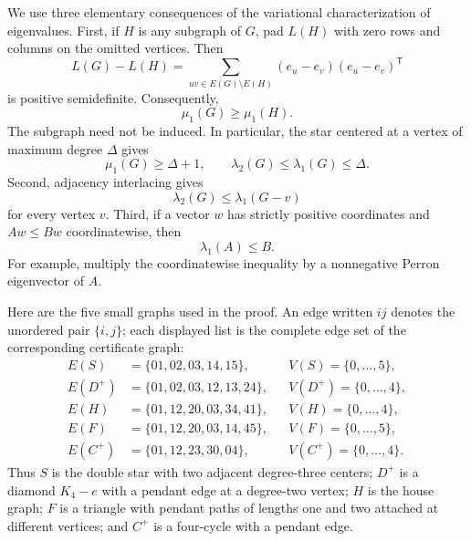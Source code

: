 \documentclass[11pt,a4paper]{article}
\numberwithin{equation}{section}
\theoremstyle{remark}
\begin{document}
We use three elementary consequences of the variational
characterization of eigenvalues. First, if $H$ is any subgraph of
$G$, pad $L(H)$ with zero rows and columns on the omitted vertices.
Then
\[
 L(G)-L(H)=\sum_{uv\in E(G)\setminus E(H)}
 (e_u-e_v)(e_u-e_v)^{\mathsf T}
\]
is positive semidefinite. Consequently,
\begin{equation}
 \mu_1(G)\ge\mu_1(H).
 \label{caz:monotonicity}
\end{equation}
The subgraph need not be induced. In particular, the star centered
at a vertex of maximum degree $\Delta$ gives
\begin{equation}
 \mu_1(G)\ge\Delta+1,
 \qquad \lambda_2(G)\le\lambda_1(G)\le\Delta.
 \label{caz:degree-bounds}
\end{equation}
Second, adjacency interlacing gives
\begin{equation}
 \lambda_2(G)\le\lambda_1(G-v)
 \label{caz:interlacing}
\end{equation}
for every vertex $v$. Third, if a vector $w$ has strictly positive
coordinates and $Aw\le B w$ coordinatewise, then
\begin{equation}
 \lambda_1(A)\le B.
 \label{caz:positive-weights}
\end{equation}
For example, multiply the coordinatewise inequality by a
nonnegative Perron eigenvector of $A$.

Here are the five small graphs used in the proof. An edge written
$ij$ denotes the unordered pair $\{i,j\}$; each displayed list is
the complete edge set of the corresponding certificate graph:
\begin{align*}
 E(S)&=\{01,02,03,14,15\},
   &&V(S)=\{0,\ldots,5\},\\
 E(D^+)&=\{01,02,03,12,13,24\},
   &&V(D^+)=\{0,\ldots,4\},\\
 E(H)&=\{01,12,20,03,34,41\},
   &&V(H)=\{0,\ldots,4\},\\
 E(F)&=\{01,12,20,03,14,45\},
   &&V(F)=\{0,\ldots,5\},\\
 E(C^+)&=\{01,12,23,30,04\},
   &&V(C^+)=\{0,\ldots,4\}.
\end{align*}
Thus $S$ is the double star with two adjacent degree-three centers;
$D^+$ is a diamond $K_4-e$ with a pendant edge at a degree-two
vertex; $H$ is the house graph; $F$ is a triangle with pendant paths
of lengths one and two attached at different vertices; and $C^+$
is a four-cycle with a pendant edge.
\end{document}
